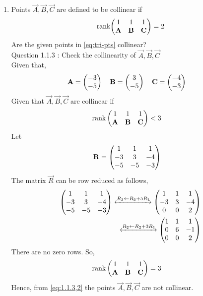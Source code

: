 \documentclass[11pt]{book}
\begin{document}
\begin{enumerate}[label=\thesection.\arabic*.,ref=\thesection.\theenumi]
\item   Points $\vec{A}, \vec{B}, \vec{C}$ are defined to be collinear if 
		\begin{align}
			\text{rank}{\ensuremath{\begin{pmatrix}1 & 1 & 1 \\ \mathbf{A}& \mathbf{B}&\mathbf{C}\end{pmatrix}}} = 2
		\end{align}
Are the given points in
			\eqref{eq:tri-pts}
collinear?\\
Question 1.1.3 : Check the collinearity of $\vec{A},\vec{B},\vec{C}$ \\ 
\solution 
Given that,
\begin{align}
    \mathbf{A} = \begin{pmatrix}-3\\-5\end{pmatrix}
    \quad
    \mathbf{B} &= \begin{pmatrix}3\\-5\end{pmatrix}
    \quad
    \mathbf{C} = \begin{pmatrix}-4\\-3\end{pmatrix}
\end{align}
Given that $\vec{A},\vec{B},\vec{C}$ are collinear if
\begin{align}
    \text{rank}\myvec{
    1 & 1 & 1\\
    \vec{A} & \vec{B} & \vec{C} \\
    } &< 3 
    \label{eq:1.1.3,2}
\end{align} 
Let
\begin{align}
    \mathbf{R}&=\begin{pmatrix}
    1 & 1 & 1
    \\
    -3 & 3 & -4
    \\
    -5 & -5 & -3
    \end{pmatrix} 
\end{align} 
The matrix $\vec{R}$ can be row reduced as follows,
\begin{align}
    \label{eq:matthrowoperations}
    \myvec{
    1 & 1 & 1
    \\
    -3 & 3 & -4
    \\
    -5 & -5 & -3
    }
     \xleftrightarrow[]{R_3 \leftarrow R_3+5R_1}
    \myvec{
    1 & 1 & 1
    \\
    -3 & 3 & -4
    \\
    0 & 0 & 2 
    }
    \\
     \xleftrightarrow[]{R_2\leftarrow R_2+3R_1}
    \myvec{
    1 & 1 & 1
    \\
    0 & 6 & -1
    \\
    0 & 0 & 2 
    }
\end{align}
There are no zero rows. So,
\begin{align}
    \text{rank}\begin{pmatrix}
    1 & 1 & 1\\
    \mathbf{A} & \mathbf{B} & \mathbf{C} \\
    \end{pmatrix} &= 3 
\end{align}  
Hence, from \eqref{eq:1.1.3,2} the points $\vec{A},\vec{B},\vec{C}$ are not collinear. 


\end{enumerate}
\end{document}
